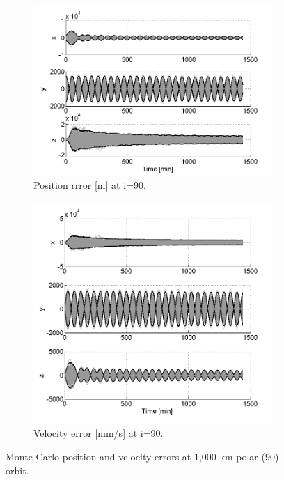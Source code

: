 \documentclass[]{aiaa-tc}%
\begin{document}
%
\begin{figure}[h!]
\centering
\begin{subfigure}{.49\textwidth}
  \centering
  \includegraphics{MC_pos90}
  \caption{Position rrror [m] at i=90\degree.}
  \label{fig:mcpos90}
\end{subfigure}%
\begin{subfigure}{.49\textwidth} 
  \centering
  \includegraphics{MC_vel90}
  \caption{Velocity error [mm/s] at i=90\degree.}
  \label{fig:mcvel90}
\end{subfigure}
\caption{Monte Carlo position and velocity errors at 1,000 km polar (90\degree) orbit.}
\label{fig:mc90}
\end{figure}
\end{document}
